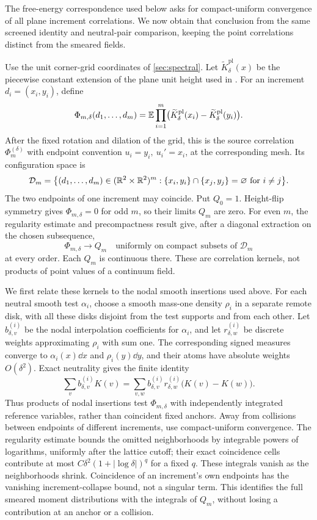 The free-energy correspondence used below asks for compact-uniform
convergence of all plane increment correlations. We now obtain that
conclusion from the same screened identity and neutral-pair comparison,
keeping the point correlations distinct from the smeared fields.

Use the unit corner-grid coordinates of \cref{sec:spectral}. Let
\(\widetilde K_\delta^{\mathrm{pl}}(x)\) be the piecewise constant extension
of the plane unit height used in \cite[Definition~2.4]{DKLM2026}. For an
increment \(d_i=(x_i,y_i)\), define
\[
 \Phi_{m,\delta}(d_1,\ldots,d_m)
   =\mathbb E\prod_{i=1}^m
       \bigl(\widetilde K_\delta^{\mathrm{pl}}(x_i)
             -\widetilde K_\delta^{\mathrm{pl}}(y_i)\bigr).
\]
After the fixed rotation and dilation of the grid, this is the source
correlation \(\Phi_m^{(\delta)}\) with endpoint convention
\(u_i=y_i,\ u_i'=x_i\), at the corresponding mesh. Its configuration space is
\[
 \mathcal D_m=
 \bigl\{(d_1,\ldots,d_m)\in(\mathbb R^2\times\mathbb R^2)^m:
   \{x_i,y_i\}\cap\{x_j,y_j\}=\varnothing\text{ for }i\ne j\bigr\}.
\]
The two endpoints of one increment may coincide. Put \(Q_0=1\).
Height-flip symmetry gives \(\Phi_{m,\delta}=0\) for odd \(m\), so their
limits \(Q_m\) are zero. For even \(m\), the regularity estimate and
precompactness result \cite[Theorem~4.5 and Corollary~4.6]{DKLM2026} give,
after a diagonal extraction on the chosen subsequence,
\[
              \Phi_{m,\delta}\longrightarrow Q_m
              \quad\text{uniformly on compact subsets of }\mathcal D_m
\]
at every order. Each \(Q_m\) is continuous there. These are correlation
kernels, not products of point values of a continuum field.

We first relate these kernels to the nodal smooth insertions used above.
For each neutral smooth test \(\alpha_i\), choose a smooth mass-one density
\(\rho_i\) in a separate remote disk, with all these disks disjoint from
the test supports and from each other. Let \(b_{\delta,v}^{(i)}\) be the
nodal interpolation coefficients for \(\alpha_i\), and let
\(r_{\delta,w}^{(i)}\) be discrete weights approximating \(\rho_i\) with
sum one. The corresponding signed measures converge to
\(\alpha_i(x)\dd x\) and \(\rho_i(y)\dd y\), and their atoms have absolute
weights \(O(\delta^2)\). Exact neutrality gives the finite identity
\[
 \sum_v b_{\delta,v}^{(i)}K(v)
 =\sum_{v,w} b_{\delta,v}^{(i)}r_{\delta,w}^{(i)}
                    \bigl(K(v)-K(w)\bigr).
\]
Thus products of nodal insertions test \(\Phi_{m,\delta}\) with
independently integrated reference variables, rather than coincident
fixed anchors. Away from collisions between endpoints of different
increments, use compact-uniform convergence. The regularity estimate
bounds the omitted neighborhoods by integrable powers of logarithms,
uniformly after the lattice cutoff; their exact coincidence cells
contribute at most \(C\delta^2(1+|\log\delta|)^q\) for a fixed \(q\).
These integrals vanish as the neighborhoods shrink. Coincidence of an
increment's own endpoints has the vanishing increment-collapse bound,
not a singular term. This identifies the full smeared moment distributions
with the integrals of \(Q_m\), without losing a contribution at an anchor
or a collision.

